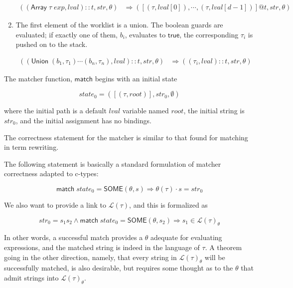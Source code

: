 \documentclass[svgnames]{llncs}
\newcommand{\konst}[1]{\ensuremath{\mathsf{#1}}}
\newcommand{\imp}{\Rightarrow}
\newcommand{\lval}{\ensuremath{\mathit{lval}}}
\newcommand{\Lang}[1]{\ensuremath{{\mathcal L}({#1})}}
\begin{document}
\begin{definition}
\begin{enumerate}
\begin{align*}
((\konst{Array}\; \tau \; \mathit{exp},\lval)::t, \mathit{str}, \theta)
   &\Rightarrow
  ([(\tau,\lval[0]), \cdots , (\tau,\lval[d-1])] @ t,\mathit{str}, \theta)
\end{align*}

\item The first element of the worklist is a union. The boolean guards
  are evaluated; if exactly one of them, $b_i$, evaluates to \konst{true}, the
  corresponding $\tau_i$ is pushed on to the stack.

\begin{align*}
((\konst{Union}\; (b_1,\tau_1) \cdots (b_n,\tau_n), \lval)::t, \mathit{str}, \theta)
   &\Rightarrow
  ((\tau_i,\lval)::t,\mathit{str}, \theta)
\end{align*}


\end{enumerate}

\noindent The matcher function, \konst{match} begins with an initial state

\[
  \mathit{state}_0 = ([(\tau,\mathit{root})],\mathit{str}_0,\emptyset)
\]

where the initial path is a default \lval{} variable named
$\mathit{root}$, the initial string is $\mathit{str}_0$, and the
initial assignment has no bindings.

\end{definition}

The correctness statement for the matcher is similar to that found for
matching in term rewriting.

\begin{theorem}

The following statement is basically a standard formulation of matcher
correctness adapted to c-types:

\[
  \konst{match}\; \mathit{state}_0 = \konst{SOME}(\theta, s)
  \imp \theta(\tau) \cdot s = \mathit{str}_0
\]

\noindent We also want to provide a link to $\Lang{\tau}$, and this is formalized as

\[
  \mathit{str}_0 = s_1 s_2 \land \konst{match}\; \mathit{state}_0 =
  \konst{SOME}(\theta, s_2) \imp s_1 \in \Lang{\tau}_{\theta}
\]

In other words, a successful match provides a $\theta$ adequate for
evaluating expressions, and the matched string is indeed in the
language of $\tau$. A theorem going in the other direction, namely,
that every string in $\Lang{\tau}_{\theta}$ will be successfully
matched, is also desirable, but requires some thought as to the
$\theta$ that admit strings into $\Lang{\tau}_{\theta}$.

\end{theorem}
\end{document}
